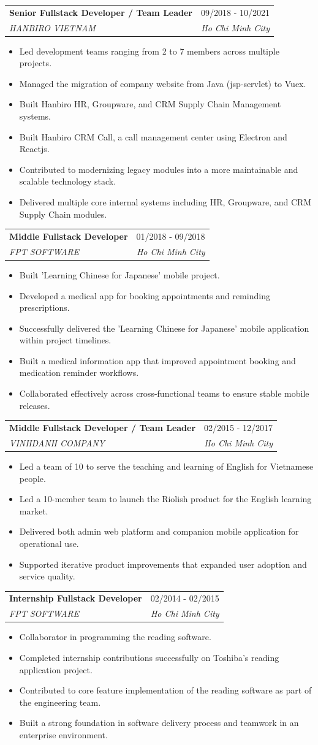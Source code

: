 \documentclass[letterpaper,11pt]{article}
\makeatletter
\newcommand{\resumeItem}[1]{
  \item\small{
    {#1 \vspace{-2pt}}
  }
}
\newcommand{\resumeSubheading}[4]{
  \vspace{-2pt}\item
    \begin{tabular*}{0.97\textwidth}[t]{l@{\extracolsep{\fill}}r}
      \textbf{#1} & #2 \\
      \textit{\small#3} & \textit{\small #4} \\
    \end{tabular*}\vspace{-7pt}
}
\newcommand{\resumeItemListStart}{\begin{itemize}}
\newcommand{\resumeItemListEnd}{\end{itemize}\vspace{-5pt}}
\makeatother
\begin{document}
    \resumeSubheading
      {Senior Fullstack Developer / Team Leader}{09/2018 - 10/2021}
      {HANBIRO VIETNAM}{Ho Chi Minh City}
      \resumeItemListStart
        \resumeItem{Led development teams ranging from 2 to 7 members across multiple projects.}
        \resumeItem{Managed the migration of company website from Java (jsp-servlet) to Vuex.}
        \resumeItem{Built Hanbiro HR, Groupware, and CRM Supply Chain Management systems.}
        \resumeItem{Built Hanbiro CRM Call, a call management center using Electron and Reactjs.}
        \resumeItem{Contributed to modernizing legacy modules into a more maintainable and scalable technology stack.}
        \resumeItem{Delivered multiple core internal systems including HR, Groupware, and CRM Supply Chain modules.}
      \resumeItemListEnd

    \resumeSubheading
      {Middle Fullstack Developer}{01/2018 - 09/2018}
      {FPT SOFTWARE}{Ho Chi Minh City}
      \resumeItemListStart
        \resumeItem{Built 'Learning Chinese for Japanese' mobile project.}
        \resumeItem{Developed a medical app for booking appointments and reminding prescriptions.}
        \resumeItem{Successfully delivered the 'Learning Chinese for Japanese' mobile application within project timelines.}
        \resumeItem{Built a medical information app that improved appointment booking and medication reminder workflows.}
        \resumeItem{Collaborated effectively across cross-functional teams to ensure stable mobile releases.}
      \resumeItemListEnd

    \resumeSubheading
      {Middle Fullstack Developer / Team Leader}{02/2015 - 12/2017}
      {VINHDANH COMPANY}{Ho Chi Minh City}
      \resumeItemListStart
        \resumeItem{Led a team of 10 to serve the teaching and learning of English for Vietnamese people.}
        \resumeItem{Led a 10-member team to launch the Riolish product for the English learning market.}
        \resumeItem{Delivered both admin web platform and companion mobile application for operational use.}
        \resumeItem{Supported iterative product improvements that expanded user adoption and service quality.}
      \resumeItemListEnd

    \resumeSubheading
      {Internship Fullstack Developer}{02/2014 - 02/2015}
      {FPT SOFTWARE}{Ho Chi Minh City}
      \resumeItemListStart
        \resumeItem{Collaborator in programming the reading software.}
        \resumeItem{Completed internship contributions successfully on Toshiba's reading application project.}
        \resumeItem{Contributed to core feature implementation of the reading software as part of the engineering team.}
        \resumeItem{Built a strong foundation in software delivery process and teamwork in an enterprise environment.}
      \resumeItemListEnd
\end{document}
